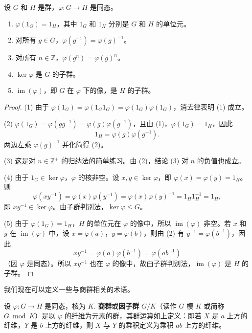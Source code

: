 \begin{proposition}\label{pro:3.1}
设 \(G\) 和 \(H\) 是群，\(\varphi : G \to H\) 是同态。
\begin{enumerate}[label=(\arabic*)]
\item \(\varphi(1_G) = 1_H\)，其中 \(1_G\) 和 \(1_H\) 分别是 \(G\) 和 \(H\) 的单位元。
\item 对所有 \(g \in G\)，\(\varphi(g^{-1}) = \varphi(g)^{-1}\)。
\item 对所有 \(n \in \mathbb{Z}\)，\(\varphi(g^n) = \varphi(g)^n\)。
\item \(\ker \varphi\) 是 \(G\) 的子群。
\item \(\operatorname{im}(\varphi)\)，即 \(G\) 在 \(\varphi\) 下的像，是 \(H\) 的子群。
\end{enumerate}
\end{proposition}

\begin{proof}
(1) 由于 \(\varphi(1_G) = \varphi(1_G 1_G) = \varphi(1_G)\varphi(1_G)\)，消去律表明 (1) 成立。

(2) \(\varphi(1_G) = \varphi(gg^{-1}) = \varphi(g)\varphi(g^{-1})\)，且由 (1)，\(\varphi(1_G) = 1_H\)，因此
\[
1_H = \varphi(g)\varphi(g^{-1}).
\]
两边左乘 \(\varphi(g)^{-1}\) 并化简得 (2)。

(3) 这是对 \(n \in \mathbb{Z}^+\) 的归纳法的简单练习。由 (2)，结论 (3) 对 \(n\) 的负值也成立。

(4) 由于 \(1_G \in \ker \varphi\)，\(\varphi\) 的核非空。设 \(x, y \in \ker \varphi\)，即 \(\varphi(x) = \varphi(y) = 1_H\)。则
\[
\varphi(xy^{-1}) = \varphi(x)\varphi(y^{-1}) = \varphi(x)\varphi(y)^{-1} = 1_H 1_H^{-1} = 1_H,
\]
即 \(xy^{-1} \in \ker \varphi\)。由子群判别法，\(\ker \varphi \leq G\)。

(5) 由于 \(\varphi(1_G) = 1_H\)，\(H\) 的单位元在 \(\varphi\) 的像中，所以 \(\operatorname{im}(\varphi)\) 非空。若 \(x\) 和 \(y\) 在 \(\operatorname{im}(\varphi)\) 中，设 \(x = \varphi(a)\)，\(y = \varphi(b)\)，则由 (2) 有 \(y^{-1} = \varphi(b^{-1})\)，因此
\[
xy^{-1} = \varphi(a)\varphi(b^{-1}) = \varphi(ab^{-1})
\]
（因 \(\varphi\) 是同态）。所以 \(xy^{-1}\) 也在 \(\varphi\) 的像中，故由子群判别法，\(\operatorname{im}(\varphi)\) 是 \(H\) 的子群。
\end{proof}

我们现在可以定义一些与商群相关的术语。

\begin{definition}
设 \(\varphi : G \to H\) 是同态，核为 \(K\). \textbf{商群}或\textbf{因子群} \(G/K\)（读作 \(G\) 模 \(K\) 或简称 \(G \bmod K\)）是以 \(\varphi\) 的纤维为元素的群，其群运算如上定义：即若 \(X\) 是 \(a\) 上方的纤维，\(Y\) 是 \(b\) 上方的纤维，则 \(X\) 与 \(Y\) 的乘积定义为乘积 \(ab\) 上方的纤维。
\end{definition}

